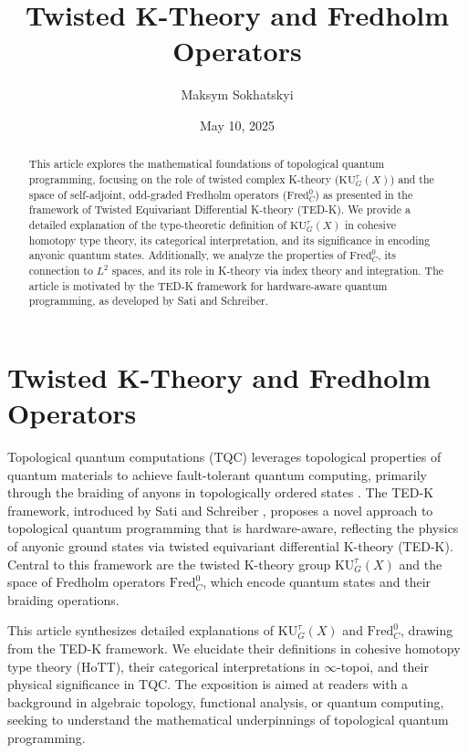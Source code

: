 \documentclass{article}
\title{Twisted K-Theory and Fredholm Operators}
\author{Maksym Sokhatskyi}
\date{May 10, 2025}
\theoremstyle{definition}
\begin{document}
\maketitle

\begin{abstract}
This article explores the mathematical foundations of topological quantum programming, focusing on the role of twisted complex K-theory (\(\mathrm{KU}^\tau_G(X)\)) and the space of self-adjoint, odd-graded Fredholm operators (\(\text{Fred}^0_C\)) as presented in the framework of Twisted Equivariant Differential K-theory (TED-K). We provide a detailed explanation of the type-theoretic definition of \(\mathrm{KU}^\tau_G(X)\) in cohesive homotopy type theory, its categorical interpretation, and its significance in encoding anyonic quantum states. Additionally, we analyze the properties of \(\text{Fred}^0_C\), its connection to \(L^2\) spaces, and its role in K-theory via index theory and integration. The article is motivated by the TED-K framework for hardware-aware quantum programming, as developed by Sati and Schreiber.
\end{abstract}

\tableofcontents

\section{Twisted K-Theory and Fredholm Operators}

Topological quantum computations (TQC) leverages topological
properties of quantum materials to achieve fault-tolerant
quantum computing, primarily through the braiding of anyons
in topologically ordered states \cite{Nayak2008}.
The TED-K framework, introduced by Sati and Schreiber \cite{SatiSchreiber2022},
proposes a novel approach to topological quantum programming that is hardware-aware,
reflecting the physics of anyonic ground states via twisted equivariant differential
K-theory (TED-K). Central to this framework are the twisted
K-theory group \(\mathrm{KU}^\tau_G(X)\) and the space of
Fredholm operators \(\text{Fred}^0_C\), which encode quantum
states and their braiding operations.

This article synthesizes detailed explanations of \(\mathrm{KU}^\tau_G(X)\) and \(\text{Fred}^0_C\), drawing from the TED-K framework. We elucidate their definitions in cohesive homotopy type theory (HoTT), their categorical interpretations in \(\infty\)-topoi, and their physical significance in TQC. The exposition is aimed at readers with a background in algebraic topology, functional analysis, or quantum computing, seeking to understand the mathematical underpinnings of topological quantum programming.
\end{document}
